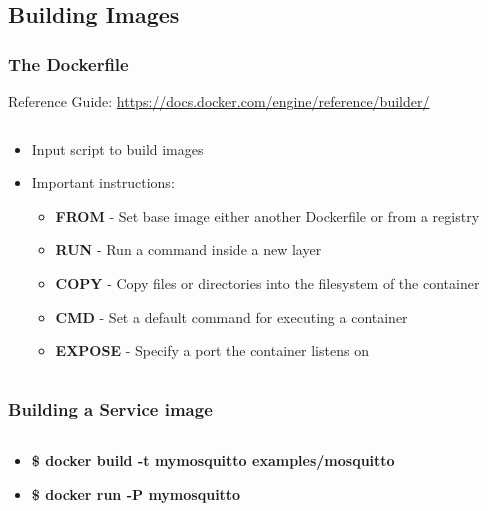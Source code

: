 \documentclass[aspectratio=169,11pt,hyperref={colorlinks=true}]{beamer}
\begin{document}
\subsection{Building Images}
\begin{frame}
    \frametitle{The Dockerfile}
    Reference Guide: \href{https://docs.docker.com/engine/reference/builder/}{https://docs.docker.com/engine/reference/builder/}
    \begin{columns}[T]
        \begin{column}{.41\textwidth}
            \begin{itemize}
                \item Input script to build images
                \item Important instructions:
                \begin{itemize}
                    \item \textbf{FROM} - Set base image either another Dockerfile or from a registry
                    \item \textbf{RUN} - Run a command inside a new layer
                    \item \textbf{COPY} - Copy files or directories into the filesystem of the container
                    \item \textbf{CMD} - Set a default command for executing a container
                    \item \textbf{EXPOSE} - Specify a port the container listens on
                \end{itemize}
            \end{itemize}
        \end{column}
        \begin{column}{.55\textwidth}
            \inputminted[fontsize=\scriptsize,breaklines,]{dockerfile}{examples/uwsgi/Dockerfile}
        \end{column}
    \end{columns}
\end{frame}

\begin{frame}
    \frametitle{Building a Service image}
    \inputminted[fontsize=\scriptsize,breaklines,linenos,frame=single]{dockerfile}{examples/mosquitto/Dockerfile}
    \begin{itemize}
        \item \textbf{\$ docker build -t mymosquitto examples/mosquitto}
        \item \textbf{\$ docker run -P mymosquitto}
    \end{itemize}
\end{frame}
\end{document}
